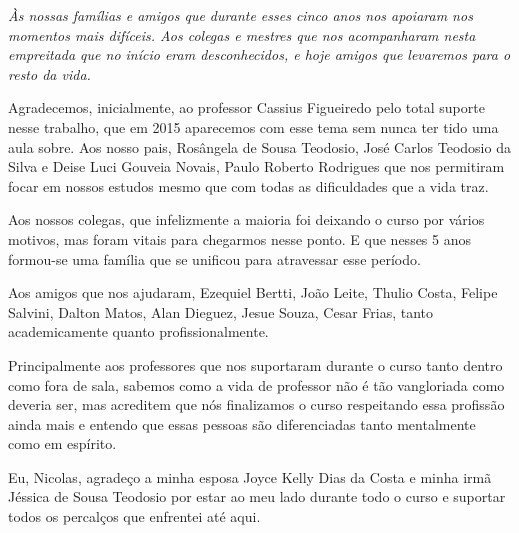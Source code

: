 \cleardoublepage
\thispagestyle{empty}
\vspace*{200mm}

\begin{flushright}
{\em 
Às nossas famílias e amigos que durante esses cinco anos nos apoiaram nos momentos mais difíceis.
Aos colegas e mestres que nos acompanharam nesta empreitada que no início eram desconhecidos, e hoje amigos que levaremos para o resto da vida.
}
\end{flushright}
\newpage


\hspace{5mm}
Agradecemos, inicialmente, ao professor Cassius Figueiredo pelo total suporte nesse trabalho, que em 2015 aparecemos com esse tema sem nunca ter tido uma aula sobre. Aos nosso pais, Rosângela de Sousa Teodosio, José Carlos Teodosio da Silva e Deise Luci Gouveia Novais, Paulo Roberto Rodrigues que nos permitiram focar em nossos estudos mesmo que com todas as dificuldades que a vida traz.

Aos nossos colegas, que infelizmente a maioria foi deixando o curso por vários motivos, mas foram vitais para chegarmos nesse ponto. E que nesses 5 anos formou-se uma família que se unificou para atravessar esse período.

Aos amigos que nos ajudaram, Ezequiel Bertti, João Leite, Thulio Costa, Felipe Salvini, Dalton Matos, Alan Dieguez, Jesue Souza, Cesar Frias, tanto academicamente quanto profissionalmente.

Principalmente aos professores que nos suportaram durante o curso tanto dentro como fora de sala, sabemos como a vida de professor não é tão vangloriada como deveria ser, mas acreditem que nós finalizamos o curso respeitando essa profissão ainda mais e entendo que essas pessoas são diferenciadas tanto mentalmente como em espírito. 

Eu, Nicolas, agradeço a minha esposa Joyce Kelly Dias da Costa e minha irmã Jéssica de Sousa Teodosio por estar ao meu lado durante todo o curso e suportar todos os percalços que enfrentei até aqui.


